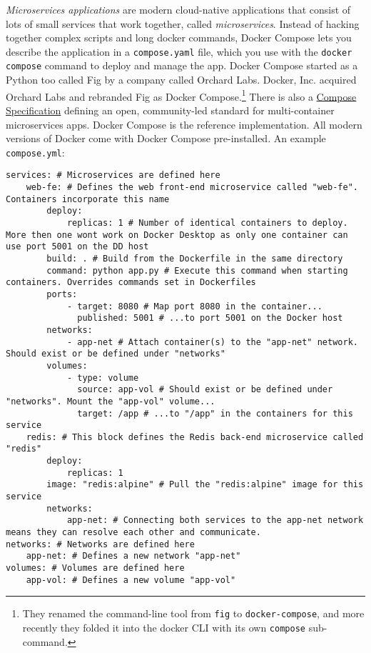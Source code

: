 \documentclass[8pt, table, xcdraw]{article}%
\begin{document}
\emph{Microservices applications} are modern cloud-native applications that consist of lots of small services that work together, called \emph{microservices}. Instead of hacking together complex scripts and long docker commands, Docker Compose lets you describe the application in a \lstinline{compose.yaml} file, which you use with the \lstinline{docker compose} command to deploy and manage the app. Docker Compose started as a Python too called Fig by a company called Orchard Labs. Docker, Inc. acquired Orchard Labs and rebranded Fig as Docker
Compose.\footnote{They renamed the command-line tool from \lstinline{fig} to \lstinline{docker-compose}, and more recently they folded it into the docker CLI with its own \lstinline{compose} sub-command.} There is also a \href{https://www.compose-spec.io/}{Compose Specification} defining an open, community-led standard for multi-container microservices apps. Docker Compose is the reference implementation. All modern versions of Docker come with Docker Compose pre-installed. An example \lstinline{compose.yml}:

\begin{lstlisting}[style=yaml]
services: # Microservices are defined here
    web-fe: # Defines the web front-end microservice called "web-fe". Containers incorporate this name
        deploy:
            replicas: 1 # Number of identical containers to deploy. More then one wont work on Docker Desktop as only one container can use port 5001 on the DD host
        build: . # Build from the Dockerfile in the same directory
        command: python app.py # Execute this command when starting containers. Overrides commands set in Dockerfiles
        ports:
            - target: 8080 # Map port 8080 in the container...
              published: 5001 # ...to port 5001 on the Docker host
        networks:
            - app-net # Attach container(s) to the "app-net" network. Should exist or be defined under "networks"
        volumes:
            - type: volume
              source: app-vol # Should exist or be defined under "networks". Mount the "app-vol" volume...
              target: /app # ...to "/app" in the containers for this service
    redis: # This block defines the Redis back-end microservice called "redis"
        deploy:
            replicas: 1
        image: "redis:alpine" # Pull the "redis:alpine" image for this service
        networks:
            app-net: # Connecting both services to the app-net network means they can resolve each other and communicate.
networks: # Networks are defined here
    app-net: # Defines a new network "app-net"
volumes: # Volumes are defined here
    app-vol: # Defines a new volume "app-vol"
\end{lstlisting}
\end{document}
